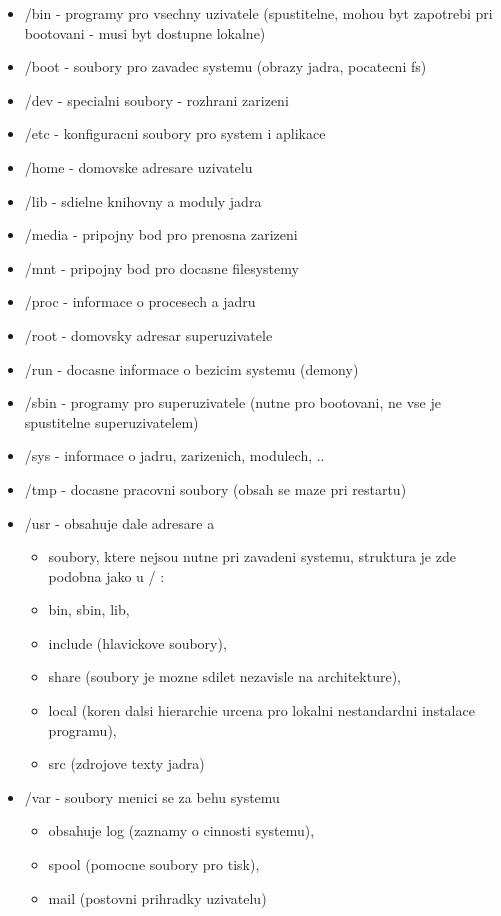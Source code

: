 \documentclass[a4paper, 11pt]{article}
\begin{document}
\begin{itemize}
    \item /bin - programy pro vsechny uzivatele (spustitelne, mohou byt zapotrebi pri bootovani - musi byt dostupne lokalne)
    \item /boot - soubory pro zavadec systemu (obrazy jadra, pocatecni fs)
    \item /dev - specialni soubory - rozhrani zarizeni
    \item /etc - konfiguracni soubory pro system i aplikace
    \item /home - domovske adresare uzivatelu
    \item /lib - sdielne knihovny a moduly jadra
    \item /media - pripojny bod pro prenosna zarizeni
    \item /mnt - pripojny bod pro docasne filesystemy
    \item /proc - informace o procesech a jadru
    \item /root - domovsky adresar superuzivatele
    \item /run - docasne informace o bezicim systemu (demony)
    \item /sbin - programy pro superuzivatele (nutne pro bootovani, ne vse je spustitelne superuzivatelem)
    \item /sys - informace o jadru, zarizenich, modulech, ..
    \item /tmp - docasne pracovni soubory (obsah se maze pri restartu)
    \item /usr - obsahuje dale adresare a
    \begin{itemize}
        \item soubory, ktere nejsou nutne pri zavadeni systemu, struktura je zde podobna jako u / :
        \item bin, sbin, lib,
        \item include (hlavickove soubory),
        \item share (soubory je mozne sdilet nezavisle na architekture),
        \item local (koren dalsi hierarchie urcena pro lokalni nestandardni instalace programu),
        \item src (zdrojove texty jadra)
    \end{itemize}
    \item /var - soubory menici se za behu systemu
    \begin{itemize}
        \item obsahuje log (zaznamy o cinnosti systemu), 
        \item spool (pomocne soubory pro tisk),
        \item mail (postovni prihradky uzivatelu) \\
    \end{itemize}
\end{itemize}
\end{document}

